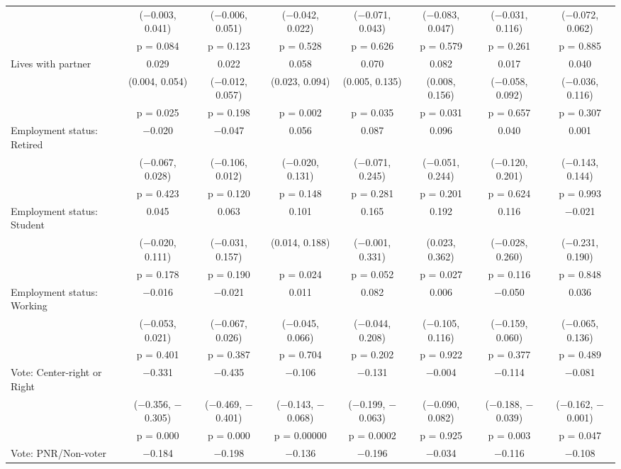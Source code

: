\begin{tabular}{@{\extracolsep{5pt}}lccccccc}
  & ($-$0.003, 0.041) & ($-$0.006, 0.051) & ($-$0.042, 0.022) & ($-$0.071, 0.043) & ($-$0.083, 0.047) & ($-$0.031, 0.116) & ($-$0.072, 0.062) \\ 
  & p = 0.084 & p = 0.123 & p = 0.528 & p = 0.626 & p = 0.579 & p = 0.261 & p = 0.885 \\ 
  Lives with partner & 0.029 & 0.022 & 0.058 & 0.070 & 0.082 & 0.017 & 0.040 \\ 
  & (0.004, 0.054) & ($-$0.012, 0.057) & (0.023, 0.094) & (0.005, 0.135) & (0.008, 0.156) & ($-$0.058, 0.092) & ($-$0.036, 0.116) \\ 
  & p = 0.025 & p = 0.198 & p = 0.002 & p = 0.035 & p = 0.031 & p = 0.657 & p = 0.307 \\ 
  Employment status: Retired & $-$0.020 & $-$0.047 & 0.056 & 0.087 & 0.096 & 0.040 & 0.001 \\ 
  & ($-$0.067, 0.028) & ($-$0.106, 0.012) & ($-$0.020, 0.131) & ($-$0.071, 0.245) & ($-$0.051, 0.244) & ($-$0.120, 0.201) & ($-$0.143, 0.144) \\ 
  & p = 0.423 & p = 0.120 & p = 0.148 & p = 0.281 & p = 0.201 & p = 0.624 & p = 0.993 \\ 
  Employment status: Student & 0.045 & 0.063 & 0.101 & 0.165 & 0.192 & 0.116 & $-$0.021 \\ 
  & ($-$0.020, 0.111) & ($-$0.031, 0.157) & (0.014, 0.188) & ($-$0.001, 0.331) & (0.023, 0.362) & ($-$0.028, 0.260) & ($-$0.231, 0.190) \\ 
  & p = 0.178 & p = 0.190 & p = 0.024 & p = 0.052 & p = 0.027 & p = 0.116 & p = 0.848 \\ 
  Employment status: Working & $-$0.016 & $-$0.021 & 0.011 & 0.082 & 0.006 & $-$0.050 & 0.036 \\ 
  & ($-$0.053, 0.021) & ($-$0.067, 0.026) & ($-$0.045, 0.066) & ($-$0.044, 0.208) & ($-$0.105, 0.116) & ($-$0.159, 0.060) & ($-$0.065, 0.136) \\ 
  & p = 0.401 & p = 0.387 & p = 0.704 & p = 0.202 & p = 0.922 & p = 0.377 & p = 0.489 \\ 
  Vote: Center-right or Right & $-$0.331 & $-$0.435 & $-$0.106 & $-$0.131 & $-$0.004 & $-$0.114 & $-$0.081 \\ 
  & ($-$0.356, $-$0.305) & ($-$0.469, $-$0.401) & ($-$0.143, $-$0.068) & ($-$0.199, $-$0.063) & ($-$0.090, 0.082) & ($-$0.188, $-$0.039) & ($-$0.162, $-$0.001) \\ 
  & p = 0.000 & p = 0.000 & p = 0.00000 & p = 0.0002 & p = 0.925 & p = 0.003 & p = 0.047 \\ 
  Vote: PNR/Non-voter & $-$0.184 & $-$0.198 & $-$0.136 & $-$0.196 & $-$0.034 & $-$0.116 & $-$0.108 \\ 

\end{tabular}
